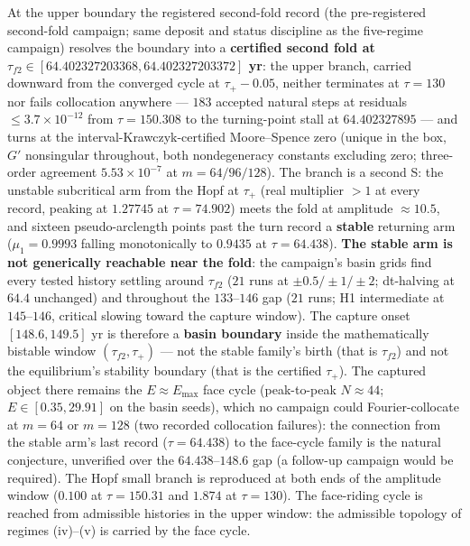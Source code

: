 \documentclass[11pt]{article}
\begin{document}
At the upper boundary the registered second-fold record (the
pre-registered second-fold campaign; same deposit and status discipline
as the five-regime campaign) resolves the boundary into a
\textbf{certified second fold at
\(\tau_{f2} \in [64.402327203368, 64.402327203372]\) yr}: the upper
branch, carried downward from the converged cycle at \(\tau_+ - 0.05\),
neither terminates at \(\tau = 130\) nor fails collocation anywhere ---
\(183\) accepted natural steps at residuals \(\le 3.7\times10^{-12}\)
from \(\tau = 150.308\) to the turning-point stall at \(64.402327895\)
--- and turns at the interval-Krawczyk-certified Moore--Spence zero
(unique in the box, \(G'\) nonsingular throughout, both nondegeneracy
constants excluding zero; three-order agreement \(5.53\times10^{-7}\) at
\(m = 64/96/128\)). The branch is a second S: the unstable subcritical
arm from the Hopf at \(\tau_+\) (real multiplier \(> 1\) at every
record, peaking at \(1.27745\) at \(\tau = 74.902\)) meets the fold at
amplitude \(\approx10.5\), and sixteen pseudo-arclength points past the
turn record a \textbf{stable} returning arm (\(\mu_1 = 0.9993\) falling
monotonically to \(0.9435\) at \(\tau = 64.438\)). \textbf{The stable
arm is not generically reachable near the fold}: the campaign's basin
grids find every tested history settling around \(\tau_{f2}\) (\(21\)
runs at \(\pm0.5/\pm1/\pm2\); dt-halving at \(64.4\) unchanged) and
throughout the \(133\)--\(146\) gap (\(21\) runs; H1 intermediate at
\(145\)--\(146\), critical slowing toward the capture window). The
capture onset \([148.6, 149.5]\) yr is therefore a \textbf{basin
boundary} inside the mathematically bistable window
\((\tau_{f2}, \tau_+)\) --- not the stable family's birth (that is
\(\tau_{f2}\)) and not the equilibrium's stability boundary (that is the
certified \(\tau_+\)). The captured object there remains the
\(E \approx E_{\max}\) face cycle (peak-to-peak \(N \approx 44\);
\(E \in [0.35, 29.91]\) on the basin seeds), which no campaign could
Fourier-collocate at \(m = 64\) or \(m = 128\) (two recorded collocation
failures): the connection from the stable arm's last record
(\(\tau = 64.438\)) to the face-cycle family is the natural conjecture,
unverified over the \(64.438\)--\(148.6\) gap (a follow-up campaign
would be required). The Hopf small branch is reproduced at both ends of
the amplitude window (\(0.100\) at \(\tau = 150.31\) and \(1.874\) at
\(\tau = 130\)). The face-riding cycle is reached from admissible
histories in the upper window: the admissible topology of regimes
(iv)--(v) is carried by the face cycle.
\end{document}
